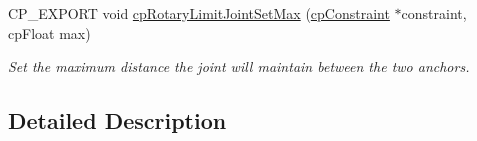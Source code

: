\begin{DoxyCompactItemize}
\mbox{\label{group__cpRotaryLimitJoint_gab4db4abac5ec4a8a66fea4382ab55381}} 
C\+P\+\_\+\+E\+X\+P\+O\+RT void \hyperlink{group__cpRotaryLimitJoint_gab4db4abac5ec4a8a66fea4382ab55381}{cp\+Rotary\+Limit\+Joint\+Set\+Max} (\hyperlink{structcpConstraint}{cp\+Constraint} $\ast$constraint, cp\+Float max)
\begin{DoxyCompactList}\small\item\em Set the maximum distance the joint will maintain between the two anchors. \end{DoxyCompactList}\end{DoxyCompactItemize}


\subsection{Detailed Description}
